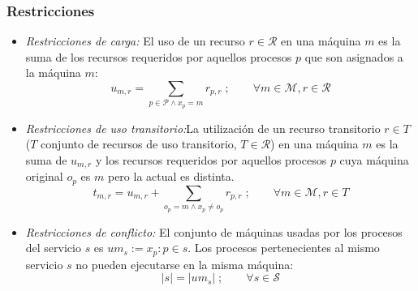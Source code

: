 \subsubsection{Restricciones}
\begin{itemize}
	\item \textit{Restricciones de carga:} El uso de un recurso $r \in \mathcal{R}$ en una máquina $m$ es la suma de los recursos requeridos por aquellos procesos $p$ que son asignados a la máquina $m$:
		\begin{equation}\label{modelo2:r1}
			u_{m,r} = \sum_{p \in \mathcal{P} \wedge x_p = m}r_{p,r}\;; \qquad \forall m \in \mathcal{M}, r \in \mathcal{R}
		\end{equation} 
	
	\item \textit{Restricciones de uso transitorio:}La utilización de un recurso transitorio $r \in T$ ($T$ conjunto de recursos de uso transitorio, $T \in \mathcal{R}$) en una máquina $m$ es la suma de $u_{m,r}$ y los recursos requeridos por aquellos procesos $p$ cuya máquina original $o_p$ es $m$ pero la actual es distinta.
		\begin{equation}\label{modelo2:r2}
			t_{m,r} = u_{m,r} + \sum_{o_p=m \wedge x_p \neq o_p}r_{p,r}\;; \qquad \forall m \in \mathcal{M}, r \in T
		\end{equation}
		
	\item \textit{Restricciones de conflicto:} El conjunto de máquinas usadas por los procesos del servicio $s$ es $um_s := {x_p:p \in s}$. Los procesos pertenecientes al mismo servicio $s$ no pueden ejecutarse en la misma máquina:
		\begin{equation}\label{modelo2:r3}
			|s| = |um_s|\;; \qquad \forall s \in \mathcal{S}
		\end{equation}
	

\end{itemize}
